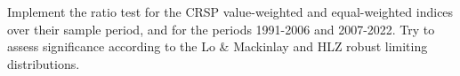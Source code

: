 Implement the \citet{lo1988stock} ratio test for the CRSP value-weighted and equal-weighted indices over their sample period, and for the periods 1991-2006 and 2007-2022. Try to assess significance according to the Lo \& Mackinlay and HLZ robust limiting distributions.